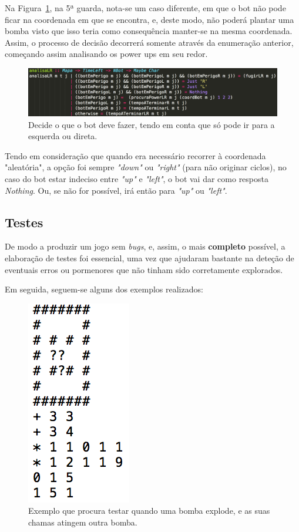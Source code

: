\documentclass[a4paper]{article}
\begin{document}
Na Figura~\ref{img:analisaLR}, na 5ª guarda, nota-se um caso diferente, em que o bot não 
pode ficar na coordenada em que se encontra, e, deste modo, não poderá plantar uma bomba visto
que isso teria como consequência manter-se na mesma coordenada. Assim, o processo de decisão
decorrerá somente através da enumeração anterior, começando assim analisando os power ups em 
seu redor.

\begin{figure}[H]
\centering 
\includegraphics[scale=0.50]{analisaLR}
\caption{Decide o que o bot deve fazer, tendo em conta que só pode ir para a esquerda ou direta.}
\label{img:analisaLR}
\end{figure}

Tendo em consideração que quando era necessário recorrer à coordenada "aleatória", a opção foi
sempre \emph{"down"} ou \emph{"right"} (para não originar ciclos), no caso do bot estar 
indeciso entre \emph{"up"} e \emph{"left"}, o bot vai dar como resposta \emph{Nothing}.
Ou, se não for possível, irá então para \emph{"up"} ou \emph{"left"}.

\subsection{Testes}

De modo a produzir um jogo sem \emph{bugs}, e, assim, o mais \textbf{completo} possível,
a elaboração de testes foi essencial, uma vez que ajudaram bastante na deteção de eventuais
erros ou pormenores que não tinham sido corretamente explorados.

Em seguida, seguem-se alguns dos exemplos realizados:

\begin{figure}[H]
\centering 
\includegraphics[scale=0.40]{exemplo24}
\caption{{\small Exemplo que procura testar quando uma bomba explode, e as suas chamas atingem outra bomba.}}
\end{figure}
\end{document}
